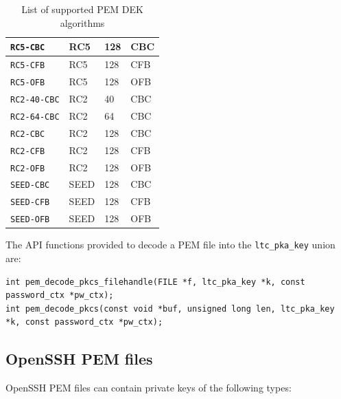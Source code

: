 \documentclass[synpaper]{book}
\begin{document}
\begin{table}[H]
\begin{small}
\begin{tabular}{|l|l|l|l|}
\hline \texttt{RC5-CBC}           & RC5             & 128                       & CBC    \\
\hline \texttt{RC5-CFB}           & RC5             & 128                       & CFB    \\
\hline \texttt{RC5-OFB}           & RC5             & 128                       & OFB    \\
\hline \texttt{RC2-40-CBC}        & RC2             & 40                        & CBC    \\
\hline \texttt{RC2-64-CBC}        & RC2             & 64                        & CBC    \\
\hline \texttt{RC2-CBC}           & RC2             & 128                       & CBC    \\
\hline \texttt{RC2-CFB}           & RC2             & 128                       & CFB    \\
\hline \texttt{RC2-OFB}           & RC2             & 128                       & OFB    \\
\hline \texttt{SEED-CBC}          & SEED            & 128                       & CBC    \\
\hline \texttt{SEED-CFB}          & SEED            & 128                       & CFB    \\
\hline \texttt{SEED-OFB}          & SEED            & 128                       & OFB    \\
\hline
\end{tabular}
\end{small}
\caption{List of supported PEM DEK algorithms}
\label{supported-pem-dek-algorithms}
\end{table}

The API functions provided to decode a PEM file into the \texttt{ltc\_pka\_key} union are:

\begin{verbatim}
int pem_decode_pkcs_filehandle(FILE *f, ltc_pka_key *k, const password_ctx *pw_ctx);
int pem_decode_pkcs(const void *buf, unsigned long len, ltc_pka_key *k, const password_ctx *pw_ctx);
\end{verbatim}

\subsection{OpenSSH PEM files}

OpenSSH PEM files can contain private keys of the following types:
\end{document}

